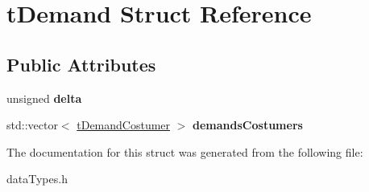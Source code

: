 \hypertarget{structt_demand}{
\section{tDemand Struct Reference}
\label{structt_demand}
}
\subsection*{Public Attributes}
\begin{DoxyCompactItemize}
\item 
\hypertarget{structt_demand_ab7fd0df3f9d2ac472aa152e8ec5594ad}{
unsigned {\bfseries delta}}
\label{structt_demand_ab7fd0df3f9d2ac472aa152e8ec5594ad}

\item 
\hypertarget{structt_demand_aad7bc752dc429b47d8f25926c4204d3e}{
std::vector$<$ \hyperlink{structt_demand_costumer}{tDemandCostumer} $>$ {\bfseries demandsCostumers}}
\label{structt_demand_aad7bc752dc429b47d8f25926c4204d3e}

\end{DoxyCompactItemize}


The documentation for this struct was generated from the following file:\begin{DoxyCompactItemize}
\item 
dataTypes.h\end{DoxyCompactItemize}
